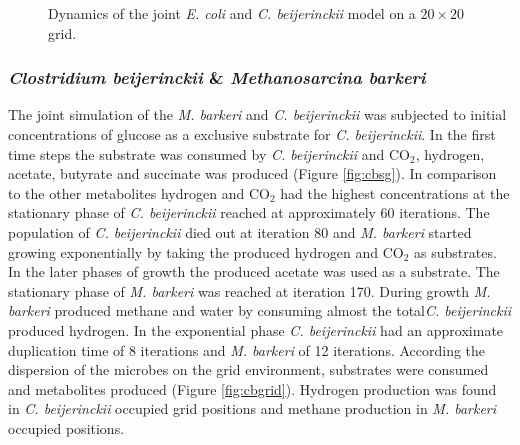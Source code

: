 \begin{figure}[h!]
{\begin{minipage}[t]{0.3\textwidth}
  \end{minipage}
  }
  \caption{Dynamics of the joint \emph{E. coli} and \emph{C. beijerinckii} model on a $20\times20$ grid.}
  \label{fig:cegrid}
\end{figure}

\subsubsection{\textit{Clostridium beijerinckii} \& \textit{Methanosarcina barkeri}}
The joint simulation of the \textit{M. barkeri} and \textit{C. beijerinckii} was subjected to initial concentrations of glucose as a exclusive substrate for \textit{C. beijerinckii}. In the first time steps the substrate was consumed by \textit{C. beijerinckii} and CO$_2$, hydrogen, acetate, butyrate and succinate was produced (Figure \hyperref[fig:cbsg]{\ref{fig:cbsg}}). 
In comparison to the other metabolites hydrogen and CO$_2$ had the highest concentrations at the stationary phase of \textit{C. beijerinckii} reached at approximately 60 iterations. The population of \textit{C. beijerinckii} died out at iteration 80 and \textit{M. barkeri} started growing exponentially by taking the produced hydrogen and CO$_2$ as substrates. In the later phases of growth the produced acetate was used as a substrate. The stationary phase of \textit{M. barkeri} was reached at iteration 170. During growth \textit{M. barkeri} produced methane and water by consuming almost the total\textit{C. beijerinckii} produced hydrogen. In the exponential phase \textit{C. beijerinckii} had an approximate duplication time of 8 iterations and \textit{M. barkeri} of 12 iterations.
According the dispersion of the microbes on the grid environment, substrates were consumed and metabolites produced (Figure \hyperref[fig:cbgrid]{\ref{fig:cbgrid}}). Hydrogen production was found in \textit{C. beijerinckii} occupied grid positions and methane production in \textit{M. barkeri} occupied positions.
